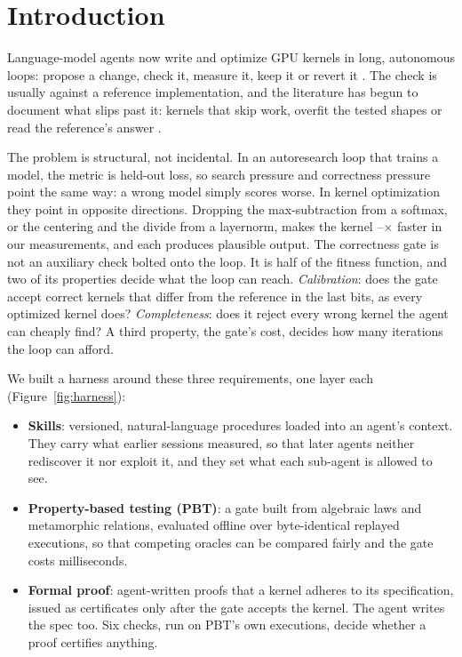 \section{Introduction}
\label{sec:intro}

Language-model agents now write and optimize GPU kernels in long, autonomous loops:
propose a change, check it, measure it, keep it or revert it
\citep{ouyang2025kernelbench,lange2025robust,karpathy2026autoresearch}. The check is
usually \allclose against a reference implementation, and the literature has begun
to document what slips past it: kernels that skip work, overfit the tested shapes or
read the reference's answer \citep{lange2025robust,sarkar2026illusion}.

The problem is structural, not incidental. In an autoresearch loop that trains a
model, the metric is held-out loss, so search pressure and correctness pressure point
the same way: a wrong model simply scores worse. In kernel optimization they point in
opposite directions. Dropping the max-subtraction from a softmax, or the centering
and the divide from a layernorm, makes the kernel \sabSpeedNoMax--\sabSpeedNoDivide$\times$
faster in our measurements, and each produces plausible output. The correctness gate
is not an auxiliary check bolted onto the loop. It is half of the fitness function, and
two of its properties decide what the loop can reach. \emph{Calibration}: does the gate
accept correct kernels that differ from the reference in the last bits, as every
optimized kernel does? \emph{Completeness}: does it reject every wrong kernel the agent
can cheaply find? A third property, the gate's cost, decides how many iterations the
loop can afford.

We built a harness around these three requirements, one layer each
(Figure~\ref{fig:harness}):
\begin{itemize}
  \item \textbf{Skills}: versioned, natural-language procedures loaded into an agent's
    context. They carry what earlier sessions measured, so that later agents neither
    rediscover it nor exploit it, and they set what each sub-agent is allowed to see.
  \item \textbf{Property-based testing (PBT)}: a gate built from algebraic laws and
    metamorphic relations, evaluated offline over byte-identical replayed executions, so
    that competing oracles can be compared fairly and the gate costs milliseconds.
  \item \textbf{Formal proof}: agent-written proofs that a kernel adheres to its
    specification, issued as certificates only after the gate accepts the kernel. The
    agent writes the spec too. Six checks, run on PBT's own executions, decide whether a
    proof certifies anything.
\end{itemize}

